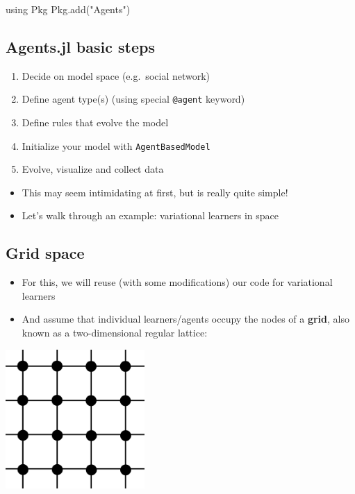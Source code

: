 \documentclass[
  letterpaper,
  DIV=11,
  numbers=noendperiod]{scrartcl}
\newenvironment{Shaded}{\begin{snugshade}}{\end{snugshade}}
\newcommand{\BuiltInTok}[1]{\textcolor[rgb]{0.00,0.23,0.31}{#1}}
\newcommand{\FunctionTok}[1]{\textcolor[rgb]{0.28,0.35,0.67}{#1}}
\newcommand{\ImportTok}[1]{\textcolor[rgb]{0.00,0.46,0.62}{#1}}
\newcommand{\NormalTok}[1]{\textcolor[rgb]{0.00,0.23,0.31}{#1}}
\newcommand{\StringTok}[1]{\textcolor[rgb]{0.13,0.47,0.30}{#1}}
\providecommand{\tightlist}{%
  \setlength{\itemsep}{0pt}\setlength{\parskip}{0pt}}\usepackage{longtable,booktabs,array}
\begin{document}
\begin{Shaded}
\begin{Highlighting}[]
\ImportTok{using} \BuiltInTok{Pkg}
\BuiltInTok{Pkg}\NormalTok{.}\FunctionTok{add}\NormalTok{(}\StringTok{"Agents"}\NormalTok{)}
\end{Highlighting}
\end{Shaded}

\subsection{Agents.jl basic steps}\label{agents.jl-basic-steps}

\begin{enumerate}
\def\labelenumi{\arabic{enumi}.}
\tightlist
\item
  Decide on model space (e.g.~social network)
\item
  Define agent type(s) (using special \texttt{@agent} keyword)
\item
  Define rules that evolve the model
\item
  Initialize your model with \texttt{AgentBasedModel}
\item
  Evolve, visualize and collect data
\end{enumerate}

\begin{itemize}
\tightlist
\item
  This may seem intimidating at first, but is really quite simple!
\item
  Let's walk through an example: variational learners in space
\end{itemize}

\subsection{Grid space}\label{grid-space}

\begin{itemize}
\tightlist
\item
  For this, we will reuse (with some modifications) our code for
  variational learners
\item
  And assume that individual learners/agents occupy the nodes of a
  \textbf{grid}, also known as a two-dimensional regular lattice:
\end{itemize}

\includegraphics[width=\textwidth,height=2.08333in]{../img/grid.png}
\end{document}
